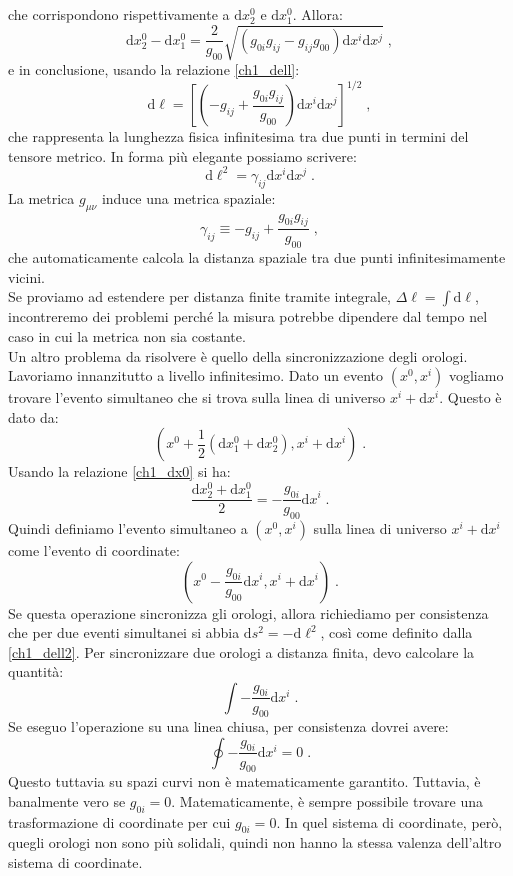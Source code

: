 \documentclass[12pt,a4paper]{report}
\theoremstyle{definition}
\newcommand{\diff}[1][]{\mathrm{d}#1}
\begin{document}
che corrispondono rispettivamente a $\diff{x^0_2}$ e $\diff{x^0_1}$. Allora:
\begin{equation}
\diff{x^0_2}-\diff{x^0_1}=\frac{2}{g_{00}}\sqrt{(g_{0i}g_{ij}-g_{ij}g_{00})\diff{x^i}\diff{x^j}}\;,
\end{equation}
e in conclusione, usando la relazione \eqref{ch1_dell}:
\begin{equation}
\diff{\ell}=\left[\left(-g_{ij}+\frac{g_{0i}g_{ij}}{g_{00}}\right)\diff{x^i}\diff{x^j}\right]^{1/2}\;, \label{ch1_dell2}
\end{equation}
che rappresenta la lunghezza fisica infinitesima tra due punti in termini del tensore metrico. In forma più elegante possiamo scrivere:
\begin{equation}
\diff{\ell^2}=\gamma_{ij}\diff{x^i}\diff{x^j}\;.
\end{equation}
La metrica $g_{\mu\nu}$ induce una metrica spaziale:
\begin{equation}
\gamma_{ij}\equiv -g_{ij}+\frac{g_{0i}g_{ij}}{g_{00}}\;,
\end{equation}
che automaticamente calcola la distanza spaziale tra due punti infinitesimamente vicini. \\
Se proviamo ad estendere per distanza finite tramite integrale, $\Delta\ell=\int\diff{\ell}$, incontreremo dei problemi perché la misura potrebbe dipendere dal tempo nel caso in cui la metrica non sia costante. \\
Un altro problema da risolvere è quello della sincronizzazione degli orologi. Lavoriamo innanzitutto a livello infinitesimo. Dato un evento $(x^0,x^i)$ vogliamo trovare l'evento simultaneo che si trova sulla linea di universo $x^i+\diff{x^i}$. Questo è dato da:
\begin{equation}
\left(x^0+\frac{1}{2}(\diff{x^0_1}+\diff{x^0_2}),x^i+\diff{x^i}\right)\;.
\end{equation}
Usando la relazione \eqref{ch1_dx0} si ha:
$$
\frac{\diff{x^0_2}+\diff{x^0_1}}{2}=-\frac{g_{0i}}{g_{00}}\diff{x^i}\;.
$$
Quindi definiamo l'evento simultaneo a $(x^0,x^i)$ sulla linea di universo $x^i+\diff{x^i}$ come l'evento di coordinate:
\begin{equation}
\left(x^0-\frac{g_{0i}}{g_{00}}\diff{x^i},x^i+\diff{x^i}\right)\;.
\end{equation}
Se questa operazione sincronizza gli orologi, allora richiediamo per consistenza che per due eventi simultanei si abbia $\diff{s^2}=-\diff{\ell^2}$, così come definito dalla \eqref{ch1_dell2}. Per sincronizzare due orologi a distanza finita, devo calcolare la quantità:
$$
\int -\frac{g_{0i}}{g_{00}}\diff{x^i}\;.
$$
Se eseguo l'operazione su una linea chiusa, per consistenza dovrei avere:
$$
\oint -\frac{g_{0i}}{g_{00}}\diff{x^i}=0\;.
$$
Questo tuttavia su spazi curvi non è matematicamente garantito. Tuttavia, è banalmente vero se $g_{0i}=0$. Matematicamente, è sempre possibile trovare una trasformazione di coordinate per cui $g_{0i}=0$. In quel sistema di coordinate, però, quegli orologi non sono più solidali, quindi non hanno la stessa valenza dell'altro sistema di coordinate.
\end{document}
